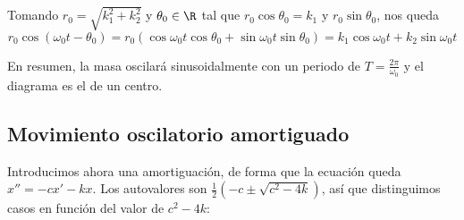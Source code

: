 \documentclass[../ecuaciones_diferenciales.tex]{subfiles}
\begin{document}
Tomando \(r_0 = \sqrt{k_1^2+k_2^2}\) y \(\theta_0 \in \R\) tal que \(r_0 \cos
\theta_0 = k_1\) y \(r_0 \sin \theta_0\), nos queda
\[r_0 \cos (\omega_0 t - \theta_0) = r_0(\cos \omega_0 t \cos \theta_0 + \sin
	\omega_0 t \sin \theta_0) = k_1 \cos \omega_0 t + k_2 \sin \omega_0 t\]

En resumen, la masa oscilará sinusoidalmente con un periodo de \(T =
\frac{2\pi}{\omega_0}\) y el diagrama es el de un centro.

\subsection{Movimiento oscilatorio amortiguado}
Introducimos ahora una amortiguación, de forma que la ecuación queda
\(x'' = - cx' - kx\). Los autovalores son \(\frac{1}{2}(-c \pm \sqrt{c^2-4k})\), así
que distinguimos casos en función del valor de \(c^2-4k\):
\end{document}
